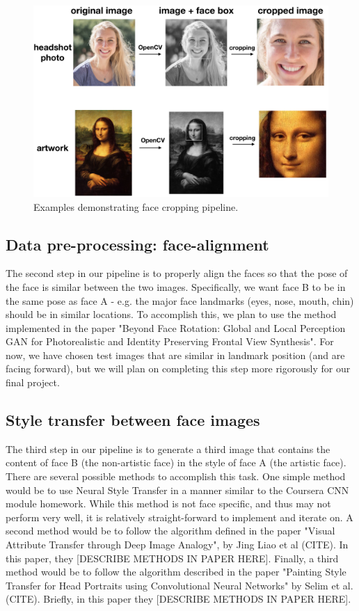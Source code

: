 \documentclass{pnastwo2}
\begin{document}
\begin{article}
\begin{figure}[ht]
	\begin{center}
		\includegraphics[width=.45\textwidth]{face_crop_figure}
		\caption{Examples demonstrating face cropping pipeline.} \label{fig:face_crop}
	\end{center}
\end{figure} 

\subsection{Data pre-processing: face-alignment}

The second step in our pipeline is to properly align the faces so that the pose of the face is similar between the two images. Specifically, we want face B to be in the same pose as face A - e.g. the major face landmarks (eyes, nose, mouth, chin) should be in similar locations. To accomplish this, we plan to use the method implemented in the paper "Beyond Face Rotation: Global and Local Perception GAN for Photorealistic and Identity Preserving Frontal View Synthesis". For now, we have chosen test images that are similar in landmark position (and are facing forward), but we will plan on completing this step more rigorously for our final project. 

\subsection{Style transfer between face images}

The third step in our pipeline is to generate a third image that contains the content of face B (the non-artistic face) in the style of face A (the artistic face). There are several possible methods to accomplish this task. One simple method would be to use Neural Style Transfer in a manner similar to the Coursera CNN module homework. While this method is not face specific, and thus may not perform very well, it is relatively straight-forward to implement and iterate on. A second method would be to follow the algorithm defined in the paper "Visual Attribute Transfer through Deep Image Analogy", by Jing Liao et al (CITE). In this paper, they [DESCRIBE METHODS IN PAPER HERE]. Finally, a third method would be to follow the algorithm described in the paper "Painting Style Transfer for Head Portraits using Convolutional Neural Networks" by Selim et al. (CITE). Briefly, in this paper they [DESCRIBE METHODS IN PAPER HERE].


\end{article}
\end{document}

